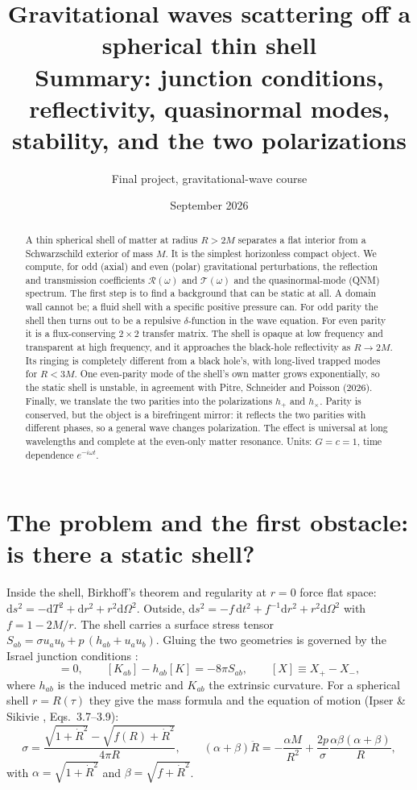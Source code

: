 \documentclass[10pt,a4paper]{article}
\title{\vspace{-8mm}\textbf{Gravitational waves scattering off a spherical thin shell}\\[2pt]
\large Summary: junction conditions, reflectivity, quasinormal modes, stability, and the two polarizations}
\author{Final project, gravitational-wave course}
\date{September 2026}
\newcommand{\dd}{\mathrm{d}}
\newcommand{\RR}{\mathcal R}
\newcommand{\TT}{\mathcal T}
\begin{document}
\maketitle
\vspace{-6mm}

\begin{abstract}\noindent
A thin spherical shell of matter at radius $R>2M$ separates a flat interior from a Schwarzschild exterior of mass $M$.
It is the simplest horizonless compact object. We compute, for odd (axial) and even (polar) gravitational
perturbations, the reflection and transmission coefficients $\RR(\omega)$ and $\TT(\omega)$ and the quasinormal-mode (QNM)
spectrum. The first step is to find a background that can be static at all. A domain wall cannot be; a fluid shell
with a specific positive pressure can. For odd parity the shell then turns out to be a repulsive $\delta$-function in
the wave equation. For even parity it is a flux-conserving $2\times2$ transfer matrix. The shell is opaque at low
frequency and transparent at high frequency, and it approaches the black-hole reflectivity as $R\to2M$. Its ringing is
completely different from a black hole's, with long-lived trapped modes for $R<3M$. One even-parity mode of the
shell's own matter grows exponentially, so the static shell is unstable, in agreement with Pitre, Schneider and Poisson
(2026). Finally, we translate the two parities into the polarizations $h_+$ and $h_\times$. Parity is conserved, but
the object is a birefringent mirror: it reflects the two parities with different phases, so a general wave changes
polarization. The effect is universal at long wavelengths and complete at the even-only matter resonance. Units:
$G=c=1$, time dependence $e^{-i\omega t}$.
\end{abstract}

\section{The problem and the first obstacle: is there a static shell?}
Inside the shell, Birkhoff's theorem and regularity at $r=0$ force flat space: $\dd s^2=-\dd T^2+\dd r^2+r^2\dd\Omega^2$.
Outside, $\dd s^2=-f\,\dd t^2+f^{-1}\dd r^2+r^2\dd\Omega^2$ with $f=1-2M/r$. The shell carries a surface stress tensor
$S_{ab}=\sigma u_au_b+p\,(h_{ab}+u_au_b)$. Gluing the two geometries is governed by the Israel junction conditions
\cite{Israel66,Poisson04}:
\begin{equation}
[h_{ab}]=0,\qquad [K_{ab}]-h_{ab}[K]=-8\pi S_{ab},\qquad [X]\equiv X_+-X_- ,
\label{eq:israel}
\end{equation}
where $h_{ab}$ is the induced metric and $K_{ab}$ the extrinsic curvature. For a spherical shell $r=R(\tau)$ they give
the mass formula and the equation of motion (Ipser \& Sikivie \cite{IS84}, Eqs.~3.7--3.9):
\begin{equation}
\sigma=\frac{\sqrt{1+\dot R^2}-\sqrt{f(R)+\dot R^2}}{4\pi R},\qquad
(\alpha+\beta)\ddot R=-\frac{\alpha M}{R^2}+\frac{2p}{\sigma}\frac{\alpha\beta(\alpha+\beta)}{R},
\end{equation}
with $\alpha=\sqrt{1+\dot R^2}$ and $\beta=\sqrt{f+\dot R^2}$.
\end{document}
